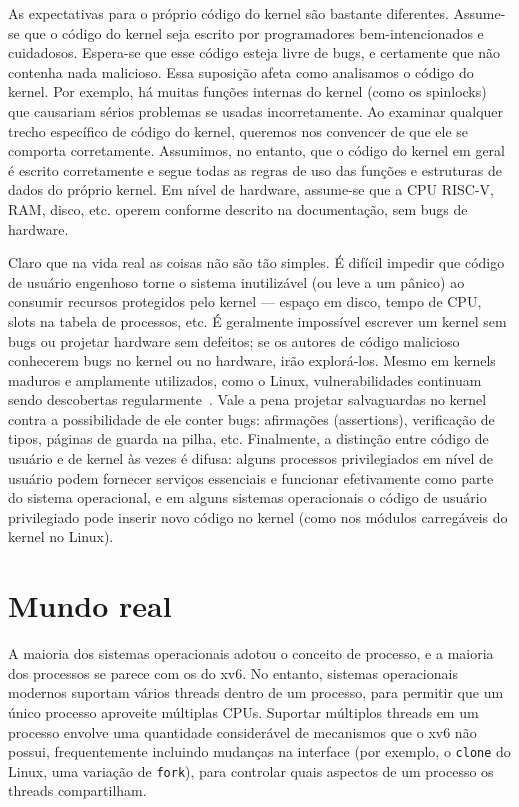 As expectativas para o próprio código do kernel são bastante diferentes. Assume-se que o código do kernel seja escrito por programadores bem-intencionados e cuidadosos. Espera-se que esse código esteja livre de bugs, e certamente que não contenha nada malicioso. Essa suposição afeta como analisamos o código do kernel. Por exemplo, há muitas funções internas do kernel (como os spinlocks) que causariam sérios problemas se usadas incorretamente. Ao examinar qualquer trecho específico de código do kernel, queremos nos convencer de que ele se comporta corretamente. Assumimos, no entanto, que o código do kernel em geral é escrito corretamente e segue todas as regras de uso das funções e estruturas de dados do próprio kernel. Em nível de hardware, assume-se que a CPU RISC-V, RAM, disco, etc. operem conforme descrito na documentação, sem bugs de hardware.

Claro que na vida real as coisas não são tão simples. É difícil impedir que código de usuário engenhoso torne o sistema inutilizável (ou leve a um pânico) ao consumir recursos protegidos pelo kernel — espaço em disco, tempo de CPU, slots na tabela de processos, etc. É geralmente impossível escrever um kernel sem bugs ou projetar hardware sem defeitos; se os autores de código malicioso conhecerem bugs no kernel ou no hardware, irão explorá-los. Mesmo em kernels maduros e amplamente utilizados, como o Linux, vulnerabilidades continuam sendo descobertas regularmente~\cite{mitre:cves}. Vale a pena projetar salvaguardas no kernel contra a possibilidade de ele conter bugs: afirmações (assertions), verificação de tipos, páginas de guarda na pilha, etc. Finalmente, a distinção entre código de usuário e de kernel às vezes é difusa: alguns processos privilegiados em nível de usuário podem fornecer serviços essenciais e funcionar efetivamente como parte do sistema operacional, e em alguns sistemas operacionais o código de usuário privilegiado pode inserir novo código no kernel (como nos módulos carregáveis do kernel no Linux).

\section{Mundo real}

A maioria dos sistemas operacionais adotou o conceito de processo, e a maioria
dos processos se parece com os do xv6. No entanto, sistemas operacionais modernos
suportam vários threads dentro de um processo, para permitir que um único processo
aproveite múltiplas CPUs. Suportar múltiplos threads em um
processo envolve uma quantidade considerável de mecanismos que o xv6 não possui,
frequentemente incluindo mudanças na interface (por exemplo, o
\lstinline{clone}
do Linux, uma variação de
\lstinline{fork}),
para controlar quais aspectos
de um processo os threads compartilham.

